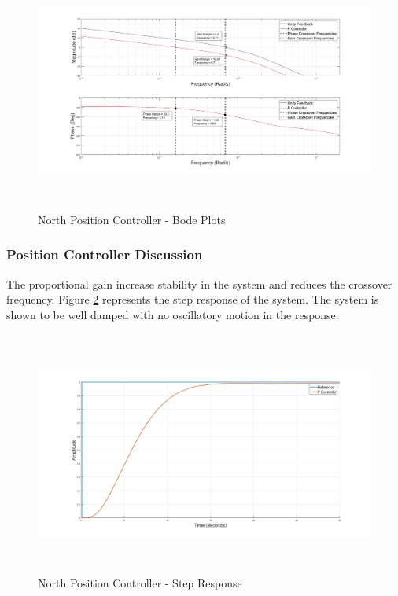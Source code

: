 	\begin{figure}[H]
		\centering
		\includegraphics[height = 8cm]{../Design/Matlab/Controllers/north_position_bode.jpg}
		\caption{North Position Controller -  Bode Plots}
		\label{IM_NorthPosControlBode}
	\end{figure}
	
		\subsubsection{Position Controller Discussion}
		The proportional gain increase stability in the system and reduces the crossover frequency. Figure \ref{IM_NorthPosControlStep} represents the step response of the system. The system is shown to be well damped with no oscillatory motion in the response. 
		
		\begin{figure}[H]
			\centering
			\includegraphics[height = 8cm]{../Design/Matlab/Controllers/north_position_step.jpg}
			\caption{North Position Controller -  Step Response}
			\label{IM_NorthPosControlStep}
		\end{figure}
		
